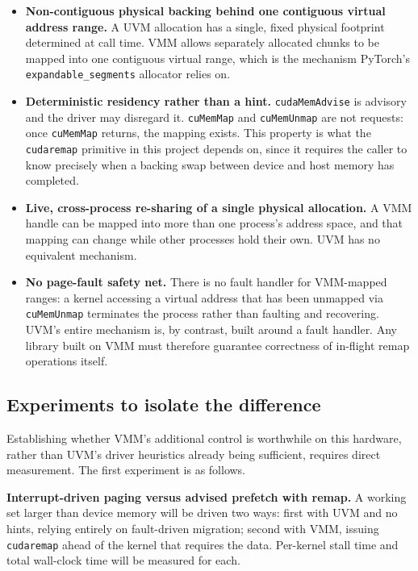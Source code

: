 \begin{itemize}
  \item \textbf{Non-contiguous physical backing behind one contiguous
    virtual address range.} A UVM allocation has a single, fixed physical
    footprint determined at call time. VMM allows separately allocated
    chunks to be mapped into one contiguous virtual range, which is the
    mechanism PyTorch's \texttt{expandable\_segments} allocator relies on.
  \item \textbf{Deterministic residency rather than a hint.}
    \texttt{cudaMemAdvise} is advisory and the driver may disregard it.
    \texttt{cuMemMap} and \texttt{cuMemUnmap} are not requests: once
    \texttt{cuMemMap} returns, the mapping exists. This property is what the
    \texttt{cudaremap} primitive in this project depends on, since it
    requires the caller to know precisely when a backing swap between
    device and host memory has completed.
  \item \textbf{Live, cross-process re-sharing of a single physical
    allocation.} A VMM handle can be mapped into more than one process's
    address space, and that mapping can change while other processes hold
    their own. UVM has no equivalent mechanism.
  \item \textbf{No page-fault safety net.} There is no fault handler for
    VMM-mapped ranges: a kernel accessing a virtual address that has been
    unmapped via \texttt{cuMemUnmap} terminates the process rather than
    faulting and recovering. UVM's entire mechanism is, by contrast, built
    around a fault handler. Any library built on VMM must therefore
    guarantee correctness of in-flight remap operations itself.
\end{itemize}

\subsection{Experiments to isolate the difference}

Establishing whether VMM's additional control is worthwhile on this
hardware, rather than UVM's driver heuristics already being sufficient,
requires direct measurement. The first experiment is as follows.

\textbf{Interrupt-driven paging versus advised prefetch with remap.} A
working set larger than device memory will be driven two ways: first with
UVM and no hints, relying entirely on fault-driven migration; second with
VMM, issuing \texttt{cudaremap} ahead of the kernel that requires the data.
Per-kernel stall time and total wall-clock time will be measured for each.
